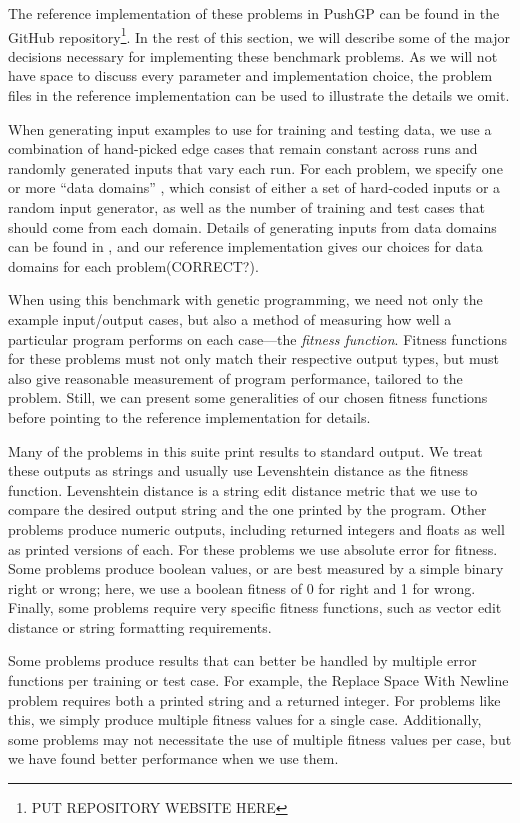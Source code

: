\documentclass{sig-alternate}
\begin{document}
The reference implementation of these problems in PushGP can be found in the GitHub repository\footnote{PUT REPOSITORY WEBSITE HERE}. In the rest of this section, we will describe some of the major decisions necessary for implementing these benchmark problems. As we will not have space to discuss every parameter and implementation choice, the problem files in the reference implementation can be used to illustrate the details we omit.

When generating input examples to use for training and testing data, we use a combination of hand-picked edge cases that remain constant across runs and randomly generated inputs that vary each run. For each problem, we specify one or more ``data domains'' \cite{Helmuth:2014:GECCO}, which consist of either a set of hard-coded inputs or a random input generator, as well as the number of training and test cases that should come from each domain. Details of generating inputs from data domains can be found in \cite{Helmuth:2014:GECCO}, and our reference implementation gives our choices for data domains for each problem\footnotemark[1] (CORRECT?).

When using this benchmark with genetic programming, we need not only the example input/output cases, but also a method of measuring how well a particular program performs on each case---the \textit{fitness function}. Fitness functions for these problems must not only match their respective output types, but must also give reasonable measurement of program performance, tailored to the problem. %
Still, we can present some generalities of our chosen fitness functions before pointing to the reference implementation for details.

Many of the problems in this suite print results to standard output. We treat these outputs as strings and usually use Levenshtein distance as the fitness function. Levenshtein distance is a string edit distance metric that we use to compare the desired output string and the one printed by the program. Other problems produce numeric outputs, including returned integers and floats as well as printed versions of each. For these problems we use absolute error for fitness. Some problems produce boolean values, or are best measured by a simple binary right or wrong; here, we use a boolean fitness of 0 for right and 1 for wrong. Finally, some problems require very specific fitness functions, such as vector edit distance or string formatting requirements.

Some problems produce results that can better be handled by multiple error functions per training or test case. For example, the Replace Space With Newline problem requires both a printed string and a returned integer. For problems like this, we simply produce multiple fitness values for a single case. Additionally, some problems may not necessitate the use of multiple fitness values per case, but we have found better performance when we use them.
\end{document}
